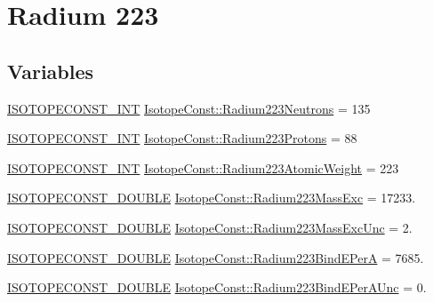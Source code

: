 \hypertarget{group___isotope_const-_radium-_ra223}{}\section{Radium 223}
\label{group___isotope_const-_radium-_ra223}
\subsection*{Variables}
\begin{DoxyCompactItemize}
\item 
\mbox{\hyperlink{group___isotope_const-_macros_ga5f18360b3e99483a35c32d789e62621c}{I\+S\+O\+T\+O\+P\+E\+C\+O\+N\+S\+T\+\_\+\+I\+NT}} \mbox{\hyperlink{group___isotope_const-_radium-_ra223_ga8dd10df71a4eebe7e19e72f0cf3d2bc7}{Isotope\+Const\+::\+Radium223\+Neutrons}} = 135
\item 
\mbox{\hyperlink{group___isotope_const-_macros_ga5f18360b3e99483a35c32d789e62621c}{I\+S\+O\+T\+O\+P\+E\+C\+O\+N\+S\+T\+\_\+\+I\+NT}} \mbox{\hyperlink{group___isotope_const-_radium-_ra223_gae548f320676f0dffeeef732a66de4608}{Isotope\+Const\+::\+Radium223\+Protons}} = 88
\item 
\mbox{\hyperlink{group___isotope_const-_macros_ga5f18360b3e99483a35c32d789e62621c}{I\+S\+O\+T\+O\+P\+E\+C\+O\+N\+S\+T\+\_\+\+I\+NT}} \mbox{\hyperlink{group___isotope_const-_radium-_ra223_ga7f73cae8e855098ef6835fd7ee9fab15}{Isotope\+Const\+::\+Radium223\+Atomic\+Weight}} = 223
\item 
\mbox{\hyperlink{group___isotope_const-_macros_ga8f45a7272ce02c0b4c65c44636ed719a}{I\+S\+O\+T\+O\+P\+E\+C\+O\+N\+S\+T\+\_\+\+D\+O\+U\+B\+LE}} \mbox{\hyperlink{group___isotope_const-_radium-_ra223_ga9c9695cea644dc98fabcd31b0465de1b}{Isotope\+Const\+::\+Radium223\+Mass\+Exc}} = 17233.
\item 
\mbox{\hyperlink{group___isotope_const-_macros_ga8f45a7272ce02c0b4c65c44636ed719a}{I\+S\+O\+T\+O\+P\+E\+C\+O\+N\+S\+T\+\_\+\+D\+O\+U\+B\+LE}} \mbox{\hyperlink{group___isotope_const-_radium-_ra223_ga3b6c33d3b3476078f94186088eb22dcc}{Isotope\+Const\+::\+Radium223\+Mass\+Exc\+Unc}} = 2.
\item 
\mbox{\hyperlink{group___isotope_const-_macros_ga8f45a7272ce02c0b4c65c44636ed719a}{I\+S\+O\+T\+O\+P\+E\+C\+O\+N\+S\+T\+\_\+\+D\+O\+U\+B\+LE}} \mbox{\hyperlink{group___isotope_const-_radium-_ra223_gae7461b76338eb1401cdb099d2fdd9787}{Isotope\+Const\+::\+Radium223\+Bind\+E\+PerA}} = 7685.
\item 
\mbox{\hyperlink{group___isotope_const-_macros_ga8f45a7272ce02c0b4c65c44636ed719a}{I\+S\+O\+T\+O\+P\+E\+C\+O\+N\+S\+T\+\_\+\+D\+O\+U\+B\+LE}} \mbox{\hyperlink{group___isotope_const-_radium-_ra223_ga77a0e62b7e118319ffc9c76bc7421ceb}{Isotope\+Const\+::\+Radium223\+Bind\+E\+Per\+A\+Unc}} = 0.

\end{DoxyCompactItemize}
